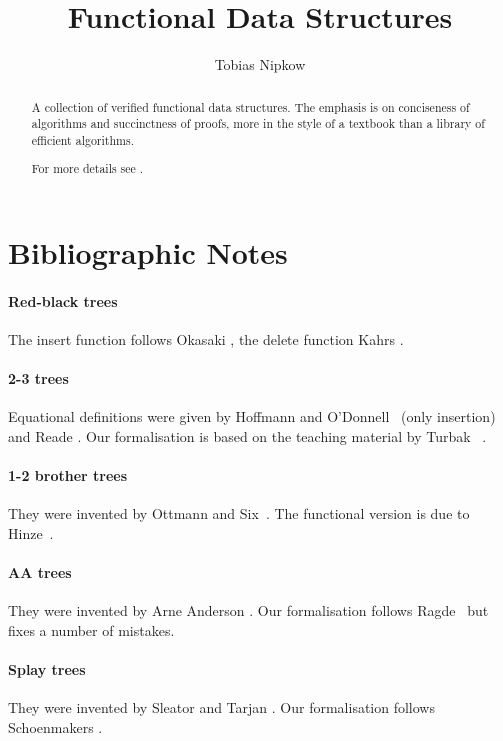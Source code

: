 \documentclass[11pt,a4paper]{article}
\begin{document}
\title{Functional Data Structures}
\author{Tobias Nipkow}
\maketitle

\begin{abstract}
A collection of verified functional data structures. The emphasis is on
conciseness of algorithms and succinctness of proofs, more in the style
of a textbook than a library of efficient algorithms.

For more details see \cite{Nipkow16}.
\end{abstract}

\setcounter{tocdepth}{1}
\tableofcontents
\newpage



\section{Bibliographic Notes}

\paragraph{Red-black trees}
The insert function follows Okasaki \cite{Okasaki}, the delete function
Kahrs \cite{Kahrs-html,Kahrs-JFP01}.

\paragraph{2-3 trees}
Equational definitions were given by Hoffmann and
O'Donnell~\cite{HoffmannOD-TOPLAS82} (only insertion)
and Reade \cite{Reade-SCP92}.
Our formalisation is based on the teaching material by
Turbak~\cite{Turbak230} .

\paragraph{1-2 brother trees}
They were invented by Ottmann and Six~\cite{OttmannS76,OttmannW-CJ80}.
The functional version is due to Hinze~\cite{Hinze-bro12}.

\paragraph{AA trees}
They were invented by Arne Anderson \cite{Andersson-WADS93}.
Our formalisation follows Ragde~\cite{Ragde14} but fixes a number
of mistakes.

\paragraph{Splay trees}
They were invented by Sleator and Tarjan \cite{SleatorT-JACM85}.
Our formalisation follows Schoenmakers \cite{Schoenmakers-IPL93}.



\end{document}
